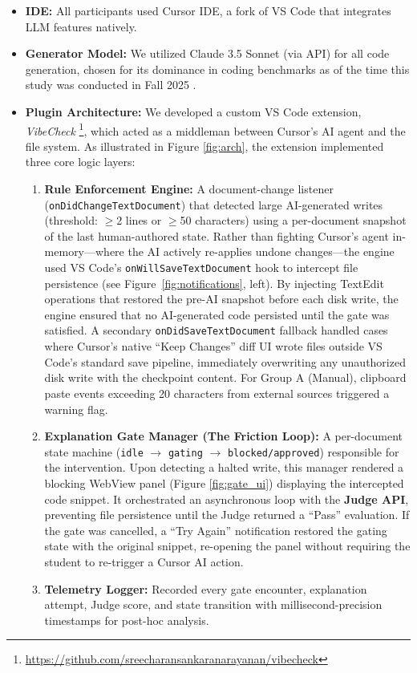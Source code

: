 \documentclass[sigconf]{acmart}
\begin{document}
\begin{itemize}
    \item \textbf{IDE:} All participants used Cursor IDE, a fork of VS Code that integrates LLM features natively.
    \item \textbf{Generator Model:} We utilized Claude 3.5 Sonnet (via API) for all code generation, chosen for its dominance in coding benchmarks as of the time this study was conducted in Fall 2025 \cite{anthropic2024claude35sonnet}.
    \item \textbf{Plugin Architecture:} We developed a custom VS Code extension, \textit{VibeCheck} \footnote{\url{https://github.com/sreecharansankaranarayanan/vibecheck}}, which acted as a middleman between Cursor's AI agent and the file system. As illustrated in Figure \ref{fig:arch}, the extension implemented three core logic layers:
    \begin{enumerate}
        \item \textbf{Rule Enforcement Engine:} A document-change listener (\texttt{onDidChangeTextDocument}) that detected large AI-generated writes (threshold: $\geq$2 lines or $\geq$50 characters) using a per-document snapshot of the last human-authored state. Rather than fighting Cursor's agent in-memory—where the AI actively re-applies undone changes—the engine used VS Code's \texttt{onWillSaveTextDocument} hook to intercept file persistence (see Figure~\ref{fig:notifications}, left). By injecting TextEdit operations that restored the pre-AI snapshot before each disk write, the engine ensured that no AI-generated code persisted until the gate was satisfied. A secondary \texttt{onDidSaveTextDocument} fallback handled cases where Cursor's native ``Keep Changes'' diff UI wrote files outside VS Code's standard save pipeline, immediately overwriting any unauthorized disk write with the checkpoint content. For Group A (Manual), clipboard paste events exceeding 20 characters from external sources triggered a warning flag.
        \item \textbf{Explanation Gate Manager (The Friction Loop):} A per-document state machine (\texttt{idle} $\to$ \texttt{gating} $\to$ \texttt{blocked/approved}) responsible for the intervention. Upon detecting a halted write, this manager rendered a blocking WebView panel (Figure \ref{fig:gate_ui}) displaying the intercepted code snippet. It orchestrated an asynchronous loop with the \textbf{Judge API}, preventing file persistence until the Judge returned a ``Pass'' evaluation. If the gate was cancelled, a ``Try Again'' notification restored the gating state with the original snippet, re-opening the panel without requiring the student to re-trigger a Cursor AI action.
        \item \textbf{Telemetry Logger:} Recorded every gate encounter, explanation attempt, Judge score, and state transition with millisecond-precision timestamps for post-hoc analysis.
    \end{enumerate}
\end{itemize}
\end{document}

